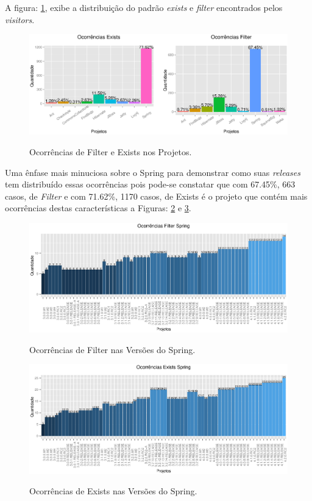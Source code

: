 A figura: \ref{fig:ocorenciasFilterExists}, exibe a distribuição do padrão \textit{exists} e \textit{filter} encontrados pelos \textit{visitors}.

\begin{figure}[h]
	\center
	\includegraphics[scale=0.5]{Imagens/ocorrenciasFilter_Exists}
	\label{fig:ocorenciasFilterExists}
	\caption{Ocorrências de Filter e Exists nos Projetos.}
\end{figure}

Uma ênfase mais minuciosa sobre o Spring para demonstrar como suas \textit{releases} tem distribuído essas ocorrências pois pode-se constatar que com 67.45\%, 663 casos,  de \textit{Filter} e com 71.62\%, 1170 casos, de Exists é o projeto que contém mais ocorrências destas características a Figuras: \ref{fig:filterSpring} e \ref{fig:existsSpring}.

\begin{figure}[h]
	\center
	\includegraphics[scale=0.7]{Imagens/ocorrenciasFilterSpring}
	\label{fig:filterSpring}
	\caption{Ocorrências de Filter nas Versões do Spring.}
\end{figure}


\begin{figure}[h]
	\center
	\includegraphics[scale=0.7]{Imagens/ocorrenciasExistsSpring}
	\label{fig:existsSpring}
	\caption{Ocorrências de Exists nas Versões do Spring.}
\end{figure}